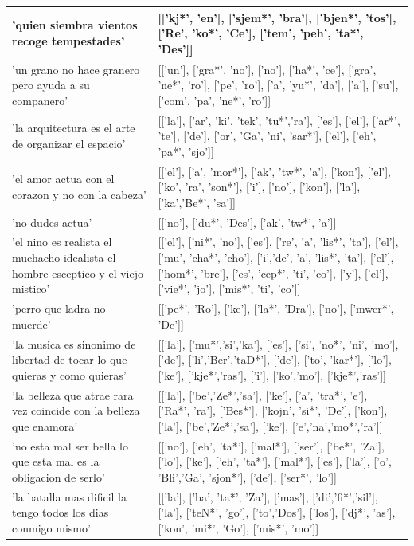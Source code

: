 \documentclass[11pt,a4paper,twoside]{tesis}
\begin{document}
\begin{longtable}{| p{} | p{} |}
'quien siembra vientos recoge tempestades' & [['kj*', 'en'], ['sjem*', 'bra'], ['bjen*', 'tos'], ['Re', 'ko*', 'Ce'], ['tem', 'peh', 'ta*', 'Des']] \\ \hline
'un grano no hace granero pero ayuda a su companero' & [['un'], ['gra*', 'no'], ['no'], ['ha*', 'ce'], ['gra', 'ne*', 'ro'], ['pe', 'ro'], ['a', 'yu*', 'da'], ['a'], ['su'], ['com', 'pa', 'ne*', 'ro']] \\ \hline
'la arquitectura es el arte de organizar el espacio' & [['la'], ['ar', 'ki', 'tek', 'tu*','ra'], ['es'], ['el'], ['ar*', 'te'], ['de'], ['or', 'Ga', 'ni', 'sar*'], ['el'], ['eh', 'pa*', 'sjo']] \\ \hline
'el amor actua con el corazon y no con la cabeza' & [['el'], ['a', 'mor*'], ['ak', 'tw*', 'a'], ['kon'], ['el'], ['ko', 'ra', 'son*'], ['i'], ['no'], ['kon'], ['la'], ['ka','Be*', 'sa']] \\ \hline
'no dudes actua' & [['no'], ['du*', 'Des'], ['ak', 'tw*', 'a']] \\ \hline
'el nino es realista el muchacho idealista el hombre esceptico y el viejo mistico' & [['el'], ['ni*', 'no'], ['es'], ['re', 'a', 'lis*', 'ta'], ['el'], ['mu', 'cha*', 'cho'], ['i','de', 'a', 'lis*', 'ta'], ['el'], ['hom*', 'bre'], ['es', 'cep*', 'ti', 'co'], ['y'], ['el'], ['vie*', 'jo'], ['mis*', 'ti', 'co']] \\ \hline
'perro que ladra no muerde' & [['pe*', 'Ro'], ['ke'], ['la*', 'Dra'], ['no'], ['mwer*', 'De']] \\ \hline
'la musica es sinonimo de libertad de tocar lo que quieras y como quieras' & [['la'], ['mu*','si','ka'], ['es'], ['si', 'no*', 'ni', 'mo'], ['de'], ['li','Ber','taD*'], ['de'], ['to', 'kar*'], ['lo'], ['ke'], ['kje*','ras'], ['i'], ['ko','mo'], ['kje*','ras']] \\ \hline
'la belleza que atrae rara vez coincide con la belleza que enamora' & [['la'], ['be','Ze*','sa'], ['ke'], ['a', 'tra*', 'e'], ['Ra*', 'ra'], ['Bes*'], ['kojn', 'si*', 'De'], ['kon'], ['la'], ['be','Ze*','sa'], ['ke'], ['e','na','mo*','ra']] \\ \hline
'no esta mal ser bella lo que esta mal es la obligacion de serlo' & [['no'], ['eh', 'ta*'], ['mal*'], ['ser'], ['be*', 'Za'], ['lo'], ['ke'], ['eh', 'ta*'], ['mal*'], ['es'], ['la'], ['o', 'Bli','Ga', 'sjon*'], ['de'], ['ser*', 'lo']] \\ \hline
'la batalla mas dificil la tengo todos los dias conmigo mismo' & [['la'], ['ba', 'ta*', 'Za'], ['mas'], ['di','fi*','sil'], ['la'], ['teN*', 'go'], ['to','Dos'], ['los'], ['dj*', 'as'], ['kon', 'mi*', 'Go'], ['mis*', 'mo']] \\ \hline

\end{longtable}
\end{document}
